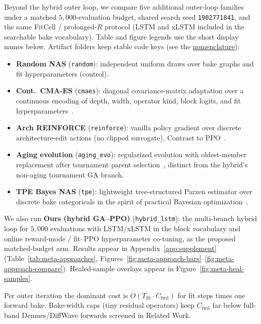 Beyond the hybrid outer loop, we compare five additional outer-loop families under a matched $5{,}000$-evaluation budget, shared search seed \texttt{1902771841}, and the same FitCell / prolonged-$R$ protocol (LSTM and xLSTM included in the searchable bake vocabulary).
Table and figure legends use the short display names below. Artifact folders keep stable code keys (see the \href{https://github.com/reeldemo/denoise-opt-meta/blob/master/paper/Unsupervised_Wavetable_Seam_Artifact_Repair_via_Hybrid_GA-PPO_Meta-Search_v11/NOMENCLATURE.md}{nomenclature}):
\begin{itemize}
  \item \textbf{Random NAS} (\texttt{random}): independent uniform draws over bake graphs and fit hyperparameters (control).
  \item \textbf{Cont.\ CMA-ES} (\texttt{cmaes}): diagonal covariance-matrix adaptation over a continuous encoding of depth, width, operator kind, block logits, and fit hyperparameters~\cite{hansen2016cmaes}.
  \item \textbf{Arch REINFORCE} (\texttt{reinforce}): vanilla policy gradient over discrete architecture-edit actions (no clipped surrogate). Contrast to PPO~\cite{schulman2017,zoph2017nas}.
  \item \textbf{Aging evolution} (\texttt{aging\_evo}): regularized evolution with oldest-member replacement after tournament parent selection~\cite{real2017large,real2019}, distinct from the hybrid's non-aging tournament GA branch.
  \item \textbf{TPE Bayes NAS} (\texttt{tpe}): lightweight tree-structured Parzen estimator over discrete bake categoricals in the spirit of practical Bayesian optimization~\cite{snoek2012}.
\end{itemize}
We also run \textbf{Ours (hybrid GA--PPO)} (\texttt{hybrid\_lstm}): the multi-branch hybrid loop for $5{,}000$ evaluations with LSTM/xLSTM in the block vocabulary and online reward-mode / fit--PPO hyperparameter co-tuning, as the proposed matched-budget arm.
Results appear in Appendix~\ref{app:supplement} (Table~\ref{tab:meta-approaches}, Figures~\ref{fig:meta-approach-bars}--\ref{fig:meta-approach-compare}). Healed-sample overlays appear in Figure~\ref{fig:meta-heal-samples}.

\begin{remark}
\label{rem:complexity}
Per outer iteration the dominant cost is $O(T_{\mathrm{fit}}\cdot C_{\mathrm{fwd}})$ for fit steps times one forward bake.
Bake-width caps (tiny residual operators) keep $C_{\mathrm{fwd}}$ far below full-band Demucs/DiffWave forwards screened in Related Work.
\end{remark}

